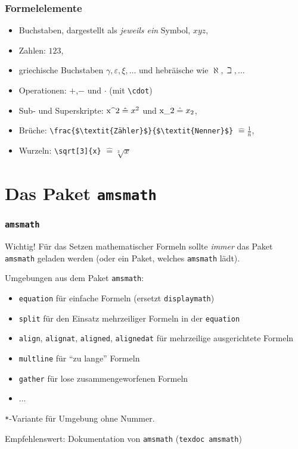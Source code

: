 \begin{frame}[fragile]
  \frametitle{Formelelemente}
    \begin{itemize}
    \item Buchstaben, dargestellt als \textit{jeweils ein} Symbol, $xyz$,
    \item Zahlen: $123$,
    \item griechische Buchstaben $\gamma, \varepsilon, \xi, \ldots$ und
      hebräische wie $\aleph, \beth, \ldots$
    \item Operationen: $+$,$-$ und $\cdot$ (mit \lstinline!\cdot!)
    \item Sub- und Superskripte: $\text{\lstinline!x^2!}  \mathrel{\hat=} x^2$
      und $\text{\lstinline!x_2!} \mathrel{\hat=} x_2$,
    \item Brüche: \lstinline!\frac{$\textit{Zähler}$}{$\textit{Nenner}$}!
      ${} \mathrel{\hat=} \frac{1}{n}$,
    \item Wurzeln: \lstinline!\sqrt[3]{x}! ${} \mathrel{\hat=} \sqrt[3]{x}$
    \end{itemize}

\end{frame}

\section{Das Paket \texttt{amsmath}}

\begin{frame}[fragile]
  \frametitle{\texttt{amsmath}}

  \onslide<+->

  \begin{block}{\textcolor{red!90}{Wichtig!}}
    Für das Setzen mathematischer Formeln sollte \emph{immer} das Paket \texttt{amsmath}
    geladen werden (oder ein Paket, welches \texttt{amsmath} lädt).
  \end{block}

  \onslide<+->

  Umgebungen aus dem Paket \texttt{amsmath}:

  \onslide<+->

  \begin{itemize}
  \item \texttt{equation} für einfache Formeln (ersetzt \texttt{displaymath})
  \item \texttt{split} für den Einsatz mehrzeiliger Formeln in der
    \texttt{equation}
  \item \texttt{align}, \texttt{alignat}, \texttt{aligned}, \texttt{alignedat}
    für mehrzeilige ausgerichtete Formeln
  \item \texttt{multline} für \enquote{zu lange} Formeln
  \item \texttt{gather} für lose zusammengeworfenen Formeln
  \item ...
  \end{itemize}
  \onslide<+->

  \texttt{*}-Variante für Umgebung ohne Nummer.

  \onslide<+->
  Empfehlenswert: Dokumentation von \texttt{amsmath} (\lstinline|texdoc amsmath|)

\end{frame}

